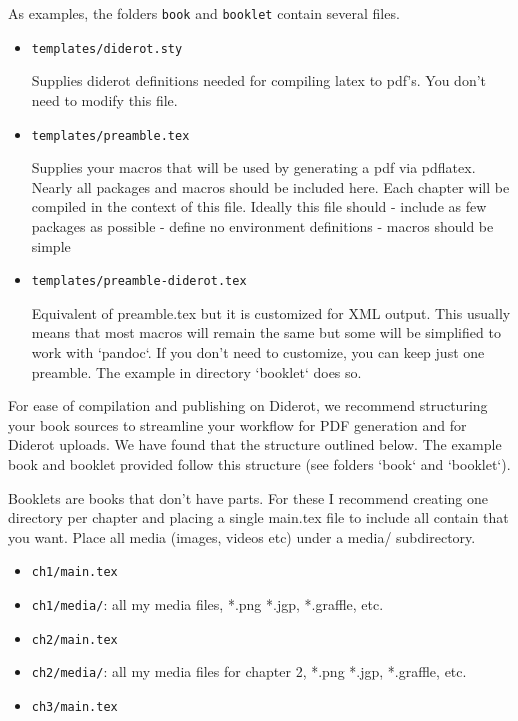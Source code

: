 As examples, 
the folders \lstinline`book` and \lstinline`booklet` contain several files.
%
\begin{itemize}
\item \lstinline`templates/diderot.sty`

   Supplies diderot definitions needed for compiling latex to pdf's.
   You don't need to modify this file.

\item \lstinline`templates/preamble.tex` 

   Supplies your macros that will be used by generating a pdf via pdflatex.  Nearly all packages and macros should be included here.  Each chapter will be compiled in the context of this file.  Ideally this file should
   - include as few packages as possible
   - define no environment definitions
   - macros should be simple

\item \lstinline`templates/preamble-diderot.tex` 

   Equivalent of preamble.tex but it is customized for XML output.  This usually means that most macros will remain the same but some will be simplified to work with `pandoc`.  If you don't need to customize, you can keep just one preamble.  The example in directory `booklet` does so.
\end{itemize}    

For ease of compilation and publishing on Diderot, we recommend
structuring your book sources to streamline your workflow for PDF
generation and for Diderot uploads.  We have found that the structure
outlined below.  The example book and booklet provided follow this
structure (see folders `book` and `booklet`).

\begin{gram}[Booklets]
 
 Booklets are books that don't have parts. For these  I recommend creating one directory per chapter and placing a single main.tex file to include all contain that you want.  Place all media (images, videos etc) under a media/ subdirectory. 
\begin{itemize}  
\item \lstinline`ch1/main.tex`
\item \lstinline`ch1/media/`: all my media files, *.png *.jgp, *.graffle, etc.
\item \lstinline`ch2/main.tex`
\item \lstinline`ch2/media/`: all my media files for chapter 2, *.png *.jgp, *.graffle, etc.
\item \lstinline`ch3/main.tex`
\end{itemize}
\end{gram}

